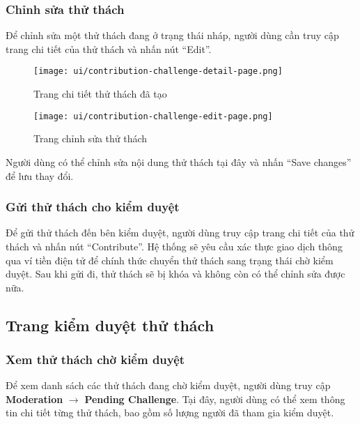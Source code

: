 \subsubsection{Chỉnh sửa thử thách}

Để chỉnh sửa một thử thách đang ở trạng thái nháp, người dùng cần truy cập trang chi tiết của thử thách và nhấn nút ``Edit''.

\begin{figure}[H]
  \centering
  \texttt{[image: ui/contribution-challenge-detail-page.png]}
  \caption{Trang chi tiết thử thách đã tạo}
  \label{fig:contribution-challenge-detail-page}
\end{figure}

\begin{figure}[H]
  \centering
  \texttt{[image: ui/contribution-challenge-edit-page.png]}
  \caption{Trang chỉnh sửa thử thách}
  \label{fig:contribution-challenge-edit-page}
\end{figure}

Người dùng có thể chỉnh sửa nội dung thử thách tại đây và nhấn ``Save changes'' để lưu thay đổi.

\subsubsection{Gửi thử thách cho kiểm duyệt}

Để gửi thử thách đến bên kiểm duyệt, người dùng truy cập trang chi tiết của thử thách và nhấn nút ``Contribute''.  
Hệ thống sẽ yêu cầu xác thực giao dịch thông qua ví tiền điện tử để chính thức chuyển thử thách sang trạng thái chờ kiểm duyệt.  
Sau khi gửi đi, thử thách sẽ bị khóa và không còn có thể chỉnh sửa được nữa.

\subsection{Trang kiểm duyệt thử thách}

\subsubsection{Xem thử thách chờ kiểm duyệt}

Để xem danh sách các thử thách đang chờ kiểm duyệt, người dùng truy cập \textbf{Moderation} $\rightarrow$ \textbf{Pending Challenge}.  
Tại đây, người dùng có thể xem thông tin chi tiết từng thử thách, bao gồm số lượng người đã tham gia kiểm duyệt.

